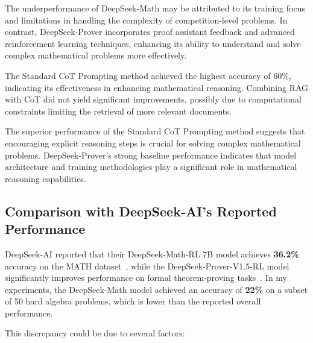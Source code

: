 \documentclass[11pt,a4paper]{article}
\begin{document}
The underperformance of DeepSeek-Math may be attributed to its training focus and limitations in handling the complexity of competition-level problems. In contrast, DeepSeek-Prover incorporates proof assistant feedback and advanced reinforcement learning techniques, enhancing its ability to understand and solve complex mathematical problems more effectively.

The Standard CoT Prompting method achieved the highest accuracy of 60\%, indicating its effectiveness in enhancing mathematical reasoning. Combining RAG with CoT did not yield significant improvements, possibly due to computational constraints limiting the retrieval of more relevant documents.

The superior performance of the Standard CoT Prompting method suggests that encouraging explicit reasoning steps is crucial for solving complex mathematical problems. DeepSeek-Prover's strong baseline performance indicates that model architecture and training methodologies play a significant role in mathematical reasoning capabilities.

\subsection{Comparison with DeepSeek-AI's Reported Performance}

DeepSeek-AI reported that their DeepSeek-Math-RL 7B model achieves \textbf{36.2\%} accuracy on the MATH dataset~\cite{shao2024deepseekmathpushinglimitsmathematical}, while the DeepSeek-Prover-V1.5-RL model significantly improves performance on formal theorem-proving tasks~\cite{xin2024deepseekproverv15harnessingproofassistant}. In my experiments, the DeepSeek-Math model achieved an accuracy of \textbf{22\%} on a subset of 50 hard algebra problems, which is lower than the reported overall performance.

This discrepancy could be due to several factors:
\end{document}
